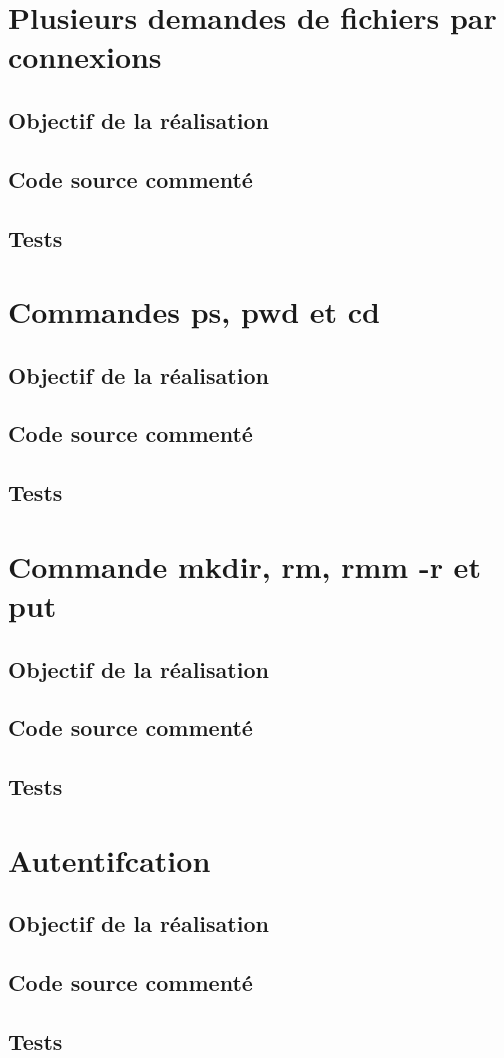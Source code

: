 \documentclass{report}
\begin{document}
    \chapter{Plusieurs demandes de fichiers par connexions}
      \section{Objectif de la r\'ealisation}
      \section{Code source comment\'e}
      \section{Tests}

      \chapter{Commandes ps, pwd et cd}
        \section{Objectif de la r\'ealisation}
        \section{Code source comment\'e}
        \section{Tests}

        \chapter{Commande mkdir, rm, rmm -r et put}
          \section{Objectif de la r\'ealisation}
          \section{Code source comment\'e}
          \section{Tests}

          \chapter{Autentifcation}
            \section{Objectif de la r\'ealisation}
            \section{Code source comment\'e}
            \section{Tests}
\end{document}
